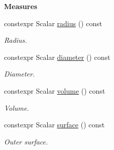 \begin{Indent}{\bf Measures}\par
\begin{DoxyCompactItemize}
\item 
constexpr Scalar \hyperlink{classmagrathea_1_1AbstractHyperSphere_adae4ee478c4da0e2476ed01bdeca772e}{radius} () const 
\begin{DoxyCompactList}\small\item\em Radius. \end{DoxyCompactList}\item 
constexpr Scalar \hyperlink{classmagrathea_1_1AbstractHyperSphere_a143afcadd29366a1f3f88bd6503579c4}{diameter} () const 
\begin{DoxyCompactList}\small\item\em Diameter. \end{DoxyCompactList}\item 
constexpr Scalar \hyperlink{classmagrathea_1_1AbstractHyperSphere_a8ffa4892227db147188d35f6a5076d7f}{volume} () const 
\begin{DoxyCompactList}\small\item\em Volume. \end{DoxyCompactList}\item 
constexpr Scalar \hyperlink{classmagrathea_1_1AbstractHyperSphere_a0ab167f1e2d23dc522fd7e09387a424e}{surface} () const 
\begin{DoxyCompactList}\small\item\em Outer surface. \end{DoxyCompactList}\end{DoxyCompactItemize}
\end{Indent}
